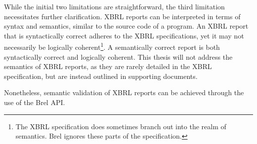 While the initial two limitations are straightforward, the third limitation necessitates further clarification.
XBRL reports can be interpreted in terms of syntax and semantics, similar to the source code of a program.
An XBRL report that is syntactically correct adheres to the XBRL specifications, yet it may not necessarily be logically coherent\footnote{The XBRL specification does sometimes branch out into the realm of semantics. Brel ignores these parts of the specification.}.
A semantically correct report is both syntactically correct and logically coherent.
This thesis will not address the semantics of XBRL reports, 
as they are rarely detailed in the XBRL specification,
but are instead outlined in supporting documents.

Nonetheless, semantic validation of XBRL reports can be achieved through the use of the Brel API.

